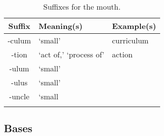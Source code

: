 \begin{longtable}{c | p{} | p{}}
    \caption{Suffixes for the mouth.}
    \hline
    Suffix & Meaning(s) & Example(s) \\ \hline
        -culum & `small' & curriculum \\
        -tion & `act of,' `process of' & action \\
        -ulum & `small' & \\
        -ulus & `small' & \\
        -uncle & `small & \\
    \label{tab:Ch8Suffix}
\end{longtable}


\subsection{Bases}

